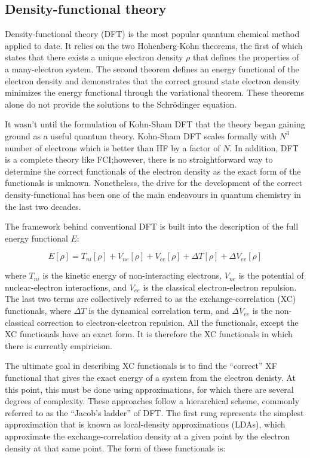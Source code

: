 \begin{doublespace}
\subsection{Density-functional theory}

Density-functional theory (DFT) is the most popular quantum chemical method
applied to date. It relies on the two Hohenberg-Kohn theorems, the first of
which states that there exists a unique electron density $\rho$ that defines
the properties of a many-electron system. The second theorem defines an energy
functional of the electron density and demonstrates that the correct ground
state electron density minimizes the energy functional through the variational
theorem.\cite{Hohenberg1964,Koch2000} These theorems alone do not provide the
solutions to the Schr{\"o}dinger equation.

It wasn't until the formulation of Kohn-Sham DFT\cite{Kohn1965} that the theory
began gaining ground as a useful quantum theory. Kohn-Sham DFT scales formally
with $N^3$ number of electrons\cite{Cramer2004} which is better than HF by a
factor of $N$. In addition, DFT is a complete theory like FCI;\@ however, there
is no straightforward way to determine the correct functionals of the electron
density as the exact form of the functionals is unknown. Nonetheless, the drive
for the development of the correct density-functional has been one of the main
endeavours in quantum chemistry in the last two decades.

The framework behind conventional DFT is built into the description of the full
energy functional $E$:

\begin{equation}
  E[\rho] = T_{ni}[\rho] + V_{ne}[\rho] + V_{ee}[\rho] + \Delta T[\rho] + \Delta V_{ee}[\rho]
\label{eq:DFT}
\end{equation}

\noindent where $T_{ni}$ is the kinetic energy of non-interacting electrons,
$V_{ne}$ is the potential of nuclear-electron interactions, and $V_{ee}$ is the
classical electron-electron repulsion. The last two terms are collectively
referred to as the exchange-correlation (XC) functionals, where $\Delta T$ is
the dynamical correlation term, and $\Delta V_{ee}$ is the non-classical
correction to electron-electron repulsion. All the functionals, except the XC
functionals have an exact form. It is therefore the XC functionals in which
there is currently empiricism.

The ultimate goal in describing XC functionals is to find the ``correct'' XF
functional that gives the exact energy of a system from the electron denisty.
At this point, this must be done using approximations, for which there are
several degrees of complexity. These approaches follow a hierarchical scheme,
commonly referred to as the ``Jacob's ladder'' of DFT.\cite{Perdew2005} The
first rung represents the simplest approximation that is known as
local-density approximations (LDAs), which approximate the exchange-correlation
density at a given point by the electron density at that same point. The form
of these functionals is:


\end{doublespace}
